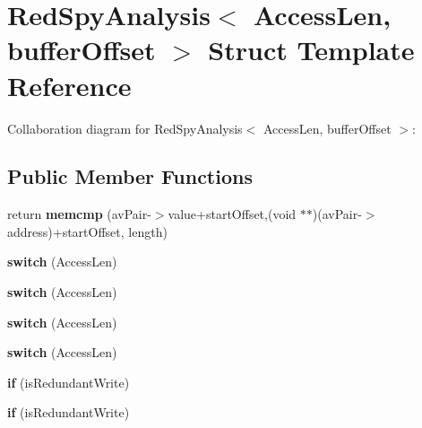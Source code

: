\hypertarget{structRedSpyAnalysis}{\section{Red\-Spy\-Analysis$<$ Access\-Len, buffer\-Offset $>$ Struct Template Reference}
\label{structRedSpyAnalysis}
}


Collaboration diagram for Red\-Spy\-Analysis$<$ Access\-Len, buffer\-Offset $>$\-:
\subsection*{Public Member Functions}
\begin{DoxyCompactItemize}
\item 
\hypertarget{structRedSpyAnalysis_a131efa9f33881101897248a3db15f965}{return {\bfseries memcmp} (av\-Pair-\/$>$value+start\-Offset,(void $\ast$$\ast$)(av\-Pair-\/$>$address)+start\-Offset, length)}\label{structRedSpyAnalysis_a131efa9f33881101897248a3db15f965}

\item 
\hypertarget{structRedSpyAnalysis_a4ea5909f3cc16bc7dbe08fc85a9d0576}{{\bfseries switch} (Access\-Len)}\label{structRedSpyAnalysis_a4ea5909f3cc16bc7dbe08fc85a9d0576}

\item 
\hypertarget{structRedSpyAnalysis_a4ea5909f3cc16bc7dbe08fc85a9d0576}{{\bfseries switch} (Access\-Len)}\label{structRedSpyAnalysis_a4ea5909f3cc16bc7dbe08fc85a9d0576}

\item 
\hypertarget{structRedSpyAnalysis_a4ea5909f3cc16bc7dbe08fc85a9d0576}{{\bfseries switch} (Access\-Len)}\label{structRedSpyAnalysis_a4ea5909f3cc16bc7dbe08fc85a9d0576}

\item 
\hypertarget{structRedSpyAnalysis_a4ea5909f3cc16bc7dbe08fc85a9d0576}{{\bfseries switch} (Access\-Len)}\label{structRedSpyAnalysis_a4ea5909f3cc16bc7dbe08fc85a9d0576}

\item 
\hypertarget{structRedSpyAnalysis_a629b6a8fb4e354e0b7c1acd2acb66598}{{\bfseries if} (is\-Redundant\-Write)}\label{structRedSpyAnalysis_a629b6a8fb4e354e0b7c1acd2acb66598}

\item 
\hypertarget{structRedSpyAnalysis_a629b6a8fb4e354e0b7c1acd2acb66598}{{\bfseries if} (is\-Redundant\-Write)}\label{structRedSpyAnalysis_a629b6a8fb4e354e0b7c1acd2acb66598}


\end{DoxyCompactItemize}
